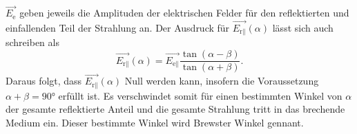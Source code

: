 $\vec{E_{\text{e}}}$ geben jeweils die Amplituden der elektrischen Felder für den reflektierten und einfallenden Teil der Strahlung an.
\newline\newline
Der Ausdruck für $\vec{E_{\text{r}\parallel}}(\alpha)$ lässt sich auch schreiben als
\begin{equation}
    \vec{E_{\text{r}\parallel}}(\alpha) = \vec{E_{\text{e}\parallel}} \frac{\tan(\alpha - \beta)}{\tan(\alpha + \beta)}.
\end{equation}
Daraus folgt, dass $\vec{E_{\text{r}\parallel}}(\alpha)$ Null werden kann, insofern die Voraussetzung $\alpha + \beta = 90°$ erfüllt ist. Es verschwindet somit für einen bestimmten
Winkel von $\alpha$ der gesamte reflektierte Anteil und die gesamte Strahlung tritt in das brechende Medium ein. Dieser bestimmte Winkel wird Brewster Winkel gennant.